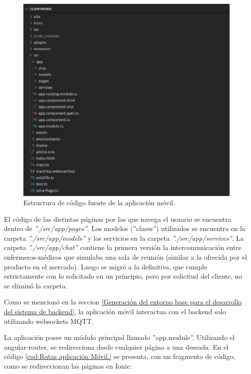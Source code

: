 \begin{figure}[ht]
	\centering
	\includegraphics[scale=.60]{./Figures/app/estructura-app.png}
	\caption{ Estructura de código fuente de la aplicación móvil.}
	\label{fig: Estructura de código fuente de la aplicación móvil.}
\end{figure} 

El código de las distintas páginas por las que navega el usuario se encuentra dentro de \textit{''./src/app/pages''}. Los modelos (''clases'') utilizados se encuentra en la carpeta \textit{''./src/app/models''} y los servicios en la carpeta \textit{''./src/app/services''}. La carpeta \textit{''./src/app/chat''} contiene la primera versión la intercomunicación entre enfermeros-médicos que simulaba una sala de reunión  (similar a la ofrecida por el producto en el mercado). Luego se migró a la definitiva, que cumple estrictamente con lo solicitado en un principio, pero por solicitud del cliente, no se eliminó la carpeta.

Como se mencionó en la seccion \ref{Generación del entorno base para el desarrollo del sistema de backend}, la aplicación móvil interactua con el backend solo utilizando websockets MQTT.

La aplicación posee un módulo principal llamado ''app.module''. Utilizando el angular-router, se redirecciona desde cualquier página a una deseada. En el código \ref{cod:Rutas aplicación Móvil.} se presenta, con un fragmento de código, como se redireccionan las páginas en Ionic:

